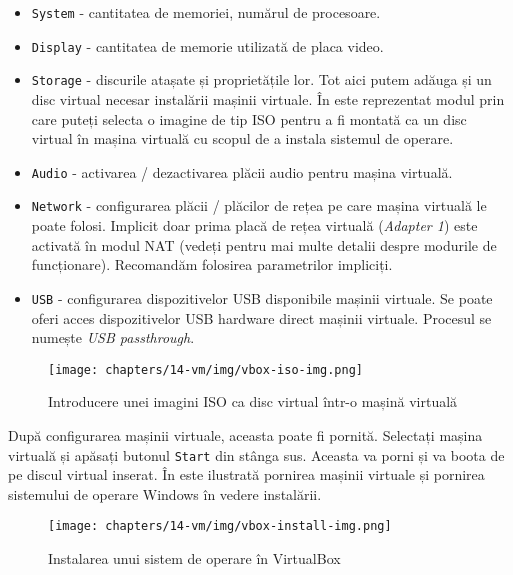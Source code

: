 \begin{itemize}
  \item \texttt{System} - cantitatea de memoriei, numărul de
    procesoare.
  \item \texttt{Display} - cantitatea de memorie utilizată de placa video.
  \item \texttt{Storage} - discurile atașate și proprietățile lor.
    Tot aici putem adăuga și un disc virtual necesar instalării
    mașinii virtuale. În 
    este reprezentat modul prin care puteți selecta o imagine de tip
    ISO pentru a fi montată ca un disc virtual în mașina virtuală
    cu scopul de a instala sistemul de operare.
  \item \texttt{Audio} - activarea / dezactivarea plăcii audio pentru mașina virtuală.
  \item \texttt{Network} - configurarea plăcii / plăcilor de rețea pe care mașina
    virtuală le poate folosi. Implicit doar prima placă de rețea virtuală
    (\textit{Adapter 1}) este activată în modul NAT (vedeți
     pentru mai multe
    detalii despre modurile de funcționare). Recomandăm folosirea
    parametrilor impliciți.
  \item \texttt{USB} - configurarea dispozitivelor USB disponibile mașinii
    virtuale. Se poate oferi acces dispozitivelor USB hardware direct
    mașinii virtuale. Procesul se numește \textit{USB passthrough}.
\end{itemize}

\begin{figure}[!htbp]
  \centering
  \texttt{[image: chapters/14-vm/img/vbox-iso-img.png]}
  \caption{Introducere unei imagini ISO ca disc virtual într-o mașină virtuală}
  \label{fig:vm:vbox-iso}
\end{figure}

După configurarea mașinii virtuale, aceasta poate fi pornită. Selectați mașina
virtuală și apăsați butonul \texttt{Start} din stânga sus. Aceasta va porni și va boota
de pe discul virtual inserat. În
 este ilustrată pornirea mașinii
virtuale și pornirea sistemului de operare Windows în vedere instalării.

\begin{figure}[!htbp]
  \centering
  \texttt{[image: chapters/14-vm/img/vbox-install-img.png]}
  \caption{Instalarea unui sistem de operare în VirtualBox}
  \label{fig:vm:vbox-install}
\end{figure}

